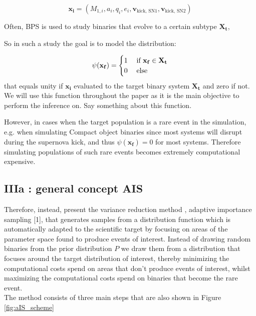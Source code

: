 \documentclass[a4paper,fleqn,usenatbib]{mnras}
\begin{document}
\begin{equation}
	\mathbf{x_i} = (M_{1,i}, a_i, q_i, e_i, \mathbf{v}_{\text{kick, SN1}}, \mathbf{v}_{\text{kick, SN2}} )
\end{equation}

Often, BPS is used to study binaries that evolve to a certain subtype $\mathbf{X_t}$,  

So in such a study the goal is to model the distribution:

\begin{align}
	\psi(\mathbf{x_f}  ) = \begin{cases} 1 \hspace{0.1cm} &\text{if } \mathbf{x_f} \in \mathbf{X_t} \\
	0  & \text{else}
	\end{cases}
\end{align}
that equals unity if $\mathbf{x_i}$ evaluated to the target binary system
$\mathbf{X_t}$ and zero if not. We will use this function throughout the
paper as it is the main objective to perform the inference
on.
Say something about this function.

However, in cases when the target population is a rare event in the simulation, e.g. when simulating Compact object binaries since most systems will disrupt during the supernova kick, and thus  $\psi(\mathbf{x_f}  )= 0 $ for most systems. Therefore simulating populations of such rare events becomes extremely computational expensive. 

\subsection{IIIa : general concept AIS}

Therefore, instead, present the variance reduction method , adaptive importance sampling [1], that generates samples
from a distribution function which is automatically adapted to the scientific target by focusing on areas
of the parameter space found to produce events of interest.
 Instead of drawing random binaries from the prior distribution $P$ we draw them from a distribution that focuses around the target distribution of interest, thereby minimizing the computational costs spend on areas that don't produce events of interest, whilst maximizing the computational costs spend on binaries that become the rare event. \\

The method consists of three main steps that are also shown in Figure  \ref{fig:aIS_scheme}
\end{document}

